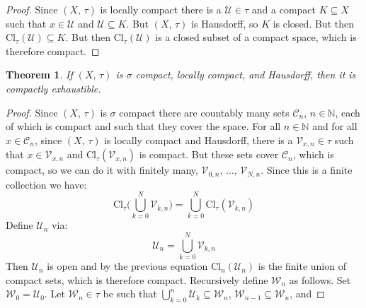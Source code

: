 \documentclass{article}
\theoremstyle{plain}
\newtheorem{theorem}{Theorem}[section]
\theoremstyle{normal}
\begin{document}
        \begin{proof}
            Since $(X,\,\tau)$ is locally compact there is a
            $\mathcal{U}\in\tau$ and a compact $K\subseteq{X}$ such that
            $x\in\mathcal{U}$ and $\mathcal{U}\subseteq{K}$. But $(X,\,\tau)$
            is Hausdorff, so $K$ is closed. But then
            $\textrm{Cl}_{\tau}(\mathcal{U})\subseteq{K}$. But then
            $\textrm{Cl}_{\tau}(\mathcal{U})$ is a closed subset of a compact
            space, which is therefore compact.
        \end{proof}
        \begin{theorem}
            If $(X,\,\tau)$ is $\sigma$ compact, locally compact, and Hausdorff,
            then it is compactly exhaustible.
        \end{theorem}
        \begin{proof}
            Since $(X,\,\tau)$ is $\sigma$ compact there are countably many
            sets $\mathcal{C}_{n}$, $n\in\mathbb{N}$, each of which is compact
            and such that they cover the space. For all $n\in\mathbb{N}$ and
            for all $x\in\mathcal{C}_{n}$, since $(X,\,\tau)$ is locally compact
            and Hausdorff, there is a $\mathcal{V}_{x,n}\in\tau$ such that
            $x\in\mathcal{V}_{x,n}$ and $\textrm{Cl}_{\tau}(\mathcal{V}_{x,n})$
            is compact. But these sets cover $\mathcal{C}_{n}$, which is
            compact, so we can do it with finitely many,
            $\mathcal{V}_{0,n},\,\dots,\,\mathcal{V}_{N,n}$. Since this is
            a finite collection we have:
            \begin{equation}
                \textrm{Cl}_{\tau}\Big(\bigcup_{k=0}^{N}\mathcal{V}_{k,n}\Big)
                =\bigcup_{k=0}^{N}\textrm{Cl}_{\tau}(\mathcal{V}_{k,n})
            \end{equation}
            Define $\mathcal{U}_{n}$ via:
            \begin{equation}
                \mathcal{U}_{n}=\bigcup_{k=0}^{N}\mathcal{V}_{k,n}
            \end{equation}
            Then $\mathcal{U}_{n}$ is open and by the previous equation
            $\textrm{Cl}_{n}(\mathcal{U}_{n})$ is the finite union of compact
            sets, which is therefore compact. Recursively define
            $\mathcal{W}_{n}$ as follows. Set $\mathcal{W}_{0}=\mathcal{U}_{0}$.
            Let $\mathcal{W}_{n}\in\tau$ be such that
            $\bigcup_{k=0}^{n}\mathcal{U}_{k}\subseteq\mathcal{W}_{n}$,
            $\mathcal{W}_{n-1}\subseteq\mathcal{W}_{n}$, and

\end{proof}
\end{document}
